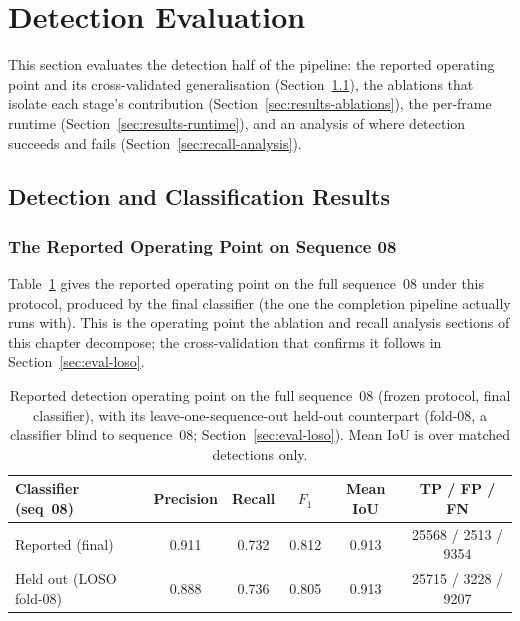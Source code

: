 \section{Detection Evaluation}
\label{sec:detection-evaluation}

This section evaluates the detection half of the pipeline: the reported
operating point and its cross-validated generalisation
(Section~\ref{sec:results-detection}), the ablations that isolate each
stage's contribution (Section~\ref{sec:results-ablations}), the per-frame runtime
(Section~\ref{sec:results-runtime}), and an analysis of
where detection succeeds and fails (Section~\ref{sec:recall-analysis}).

\subsection{Detection and Classification Results}
\label{sec:results-detection}

\subsubsection{The Reported Operating Point on Sequence 08}
\label{sec:eval-operating-point}

Table~\ref{tab:headline} gives the reported operating point on the full
sequence~08 under this protocol, produced by the final classifier (the one the
completion pipeline actually runs with). This is the operating point the
ablation and recall analysis sections of this chapter decompose; the
cross-validation that confirms it follows in Section~\ref{sec:eval-loso}.

\begin{table}[H]
  \centering
  \caption[Reported detection operating point]{Reported detection operating point on the
    full sequence~08 (frozen protocol, final classifier), with its leave-one-sequence-out
    held-out counterpart (fold-08, a classifier blind to sequence~08;
    Section~\ref{sec:eval-loso}). Mean IoU is over matched detections only.}
  \label{tab:headline}
  \setlength{\tabcolsep}{5pt}
  \begin{tabular}{lccccc}
    \toprule
    Classifier (seq~08) & Precision & Recall & $F_1$ & Mean IoU & TP / FP / FN \\
    \midrule
    Reported (final)        & 0.911 & 0.732 & 0.812 & 0.913 & \num{25568} / \num{2513} / \num{9354} \\
    Held out (LOSO fold-08) & 0.888 & 0.736 & 0.805 & 0.913 & \num{25715} / \num{3228} / \num{9207} \\
    \bottomrule
  \end{tabular}
\end{table}

